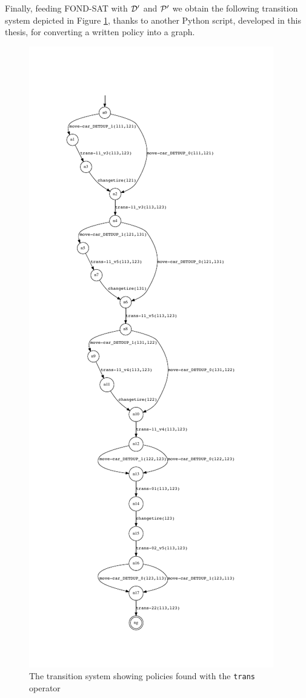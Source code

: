 Finally, feeding FOND-SAT with $\D'$ and $\P'$ we obtain the following transition system depicted in Figure \ref{fig:policy-trans}, thanks to another Python script, developed in this thesis, for converting a written policy into a graph.

\begin{figure}[h]
\centering
\includegraphics[]{images/graph-policy-trans1}
\caption{The transition system showing policies found with the \texttt{trans} operator} 
\label{fig:policy-trans}
\end{figure}

